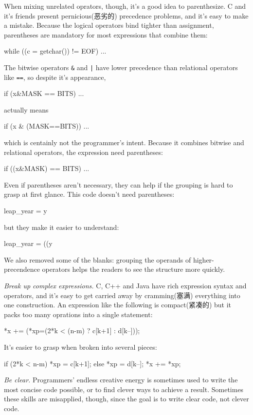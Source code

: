 When mixing unrelated oprators, though, it's a good idea to parenthesize. C
and it's friends present pernicious(恶劣的) precedence problems, and it's
easy to make a mistake. Because the logical operators bind tighter than
assignment, parentheses are mandatory for most expressions that combine them:
\begin{wellcode}
    while ((c = getchar()) != EOF)
        ...
\end{wellcode}
The bitwise operators \verb"&" and \verb"|" have lower precedence than
relational operators like \verb"==", so despite it's appearance,
\begin{badcode}
    if (x&MASK == BITS)
        ...
\end{badcode}
actually means
\begin{badcode}
    if (x & (MASK==BITS))
        ...
\end{badcode}
which is centainly not the programmer's intent. Because it combines bitwise
and relational operators, the expression need parentheses:
\begin{wellcode}
    if ((x&MASK) == BITS)
        ...
\end{wellcode}
Even if parentheses aren't necessary, they can help if the grouping is hard
to grasp at first glance. This code doesn't need parentheses:
\begin{badcode}
    leap_year = y %
\end{badcode}
but they make it easier to understand:
\begin{wellcode}
    leap_year = ((y%
\end{wellcode}
We also removed some of the blanks: grouping the operands of
higher-precendence operators helps the readers to see the structure more
quickly.

\emph{Break up complex expressions.} C, C++ and Java have rich expression
syntax and operators, and it's easy to get carried away by cramming(塞满)
everything into one construction. An expression like the following is
compact(紧凑的) but it packs too many oprations into a single statement:
\begin{badcode}
    *x += (*xp=(2*k < (n-m) ? c[k+1] : d[k--]));
\end{badcode}
It's easier to grasp when broken into several pieces:
\begin{wellcode}
    if (2*k < n-m)
        *xp = c[k+1];
    else 
        *xp = d[k--];
    *x += *xp;
\end{wellcode}
\emph{Be clear.} Programmers' endless creative energy is sometimes used to
write the most concise code possible, or to find clever ways to achieve a
result. Sometimes these skills are misapplied, though, since the goal is to
write clear code, not clever code.

